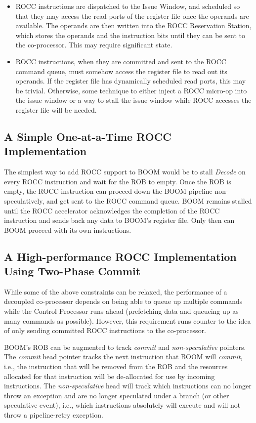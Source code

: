 \begin{itemize}
\item ROCC instructions are dispatched to the Issue Window, and scheduled so that they may access the read ports of the register file once the operands are available. The operands are then written into the ROCC Reservation Station, which stores the operands and the instruction bits until they can be sent to the co-processor.  This may require significant state. 
\item ROCC instructions, when they are committed and sent to the ROCC command queue, must somehow access the register file to read out its operands.  If the register file has dynamically scheduled read ports, this may be trivial. Otherwise, some technique to either inject a ROCC micro-op into the issue window or a way to stall the issue window while ROCC accesses the register file will be needed. 
\end{itemize}


\subsection{A Simple One-at-a-Time ROCC Implementation}

The simplest way to add ROCC support to BOOM would be to stall {\em Decode} on every ROCC instruction and wait for the ROB to empty.  Once the ROB is empty, the ROCC instruction can proceed down the BOOM pipeline non-speculatively, and get sent to the ROCC command queue.  BOOM remains stalled until the ROCC accelerator acknowledges the completion of the ROCC instruction and sends back any data to BOOM's register file. Only then can BOOM proceed with its own instructions. 


\subsection{A High-performance ROCC Implementation Using Two-Phase Commit}

While some of the above constraints can be relaxed, the performance of a decoupled co-processor depends on being able to queue up multiple commands while the Control Processor runs ahead (prefetching data and queueing up as many commands as possible).  However, this requirement runs counter to the idea of only sending committed ROCC instructions to the co-processor. 

BOOM's ROB can be augmented to track {\em commit} and {\em non-speculative} pointers. The {\em commit} head pointer tracks the next instruction that BOOM will {\em commit}, i.e., the instruction that will be removed from the ROB and the resources allocated for that instruction will be de-allocated for use by incoming instructions. The {\em non-speculative} head will track which instructions can no longer throw an exception and are no longer speculated under a branch (or other speculative event), i.e., which instructions absolutely will execute and will not throw a pipeline-retry exception. 

